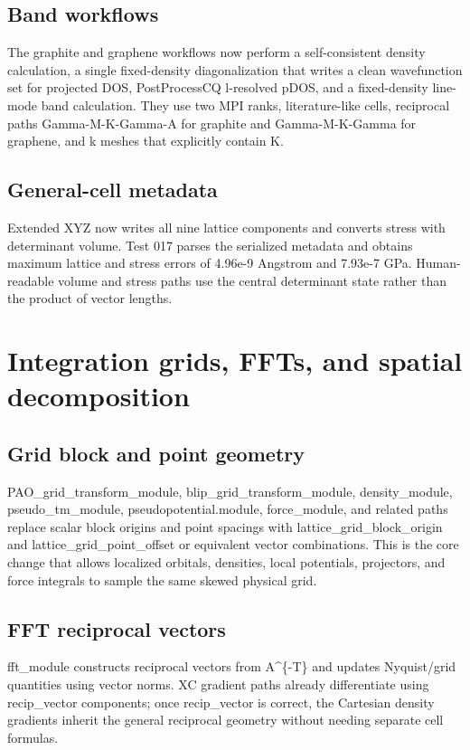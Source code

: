 \documentclass[10pt,a4paper]{report}
\begin{document}
\section{Band workflows}
The graphite and graphene workflows now perform a self-consistent density calculation, a single fixed-density diagonalization that writes a clean wavefunction set for projected DOS, PostProcessCQ l-resolved pDOS, and a fixed-density line-mode band calculation. They use two MPI ranks, literature-like cells, reciprocal paths Gamma-M-K-Gamma-A for graphite and Gamma-M-K-Gamma for graphene, and k meshes that explicitly contain K.

\section{General-cell metadata}
Extended XYZ now writes all nine lattice components and converts stress with determinant volume. Test 017 parses the serialized metadata and obtains maximum lattice and stress errors of 4.96e-9 Angstrom and 7.93e-7 GPa. Human-readable volume and stress paths use the central determinant state rather than the product of vector lengths.

\chapter{Integration grids, FFTs, and spatial decomposition}
\section{Grid block and point geometry}
PAO\_grid\_transform\_module, blip\_grid\_transform\_module, density\_module, pseudo\_tm\_module, pseudopotential.module, force\_module, and related paths replace scalar block origins and point spacings with lattice\_grid\_block\_origin and lattice\_grid\_point\_offset or equivalent vector combinations. This is the core change that allows localized orbitals, densities, local potentials, projectors, and force integrals to sample the same skewed physical grid.

\section{FFT reciprocal vectors}
fft\_module constructs reciprocal vectors from A\textasciicircum{}\{-T\} and updates Nyquist/grid quantities using vector norms. XC gradient paths already differentiate using recip\_vector components; once recip\_vector is correct, the Cartesian density gradients inherit the general reciprocal geometry without needing separate cell formulas.
\end{document}
